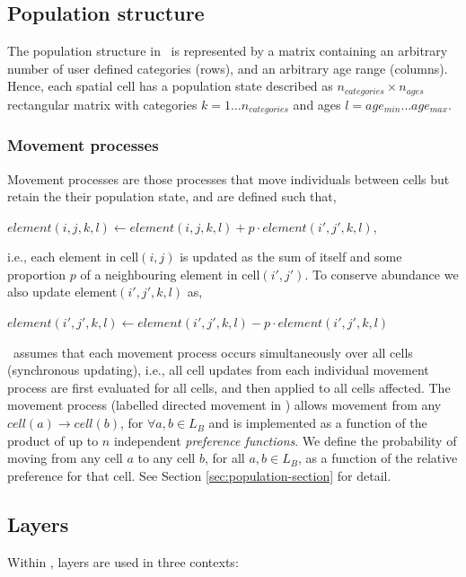 \subsection{Population structure}

The population structure in \SPM\ is represented by a matrix containing an arbitrary number of user defined categories (rows), and an arbitrary age range (columns). Hence, each spatial cell has a population state described as $n_{categories} \times n_{ages}$ rectangular matrix with categories $k=1 \ldots n_{categories}$ and ages $l=age_{min} \ldots age_{max}$. 

\subsubsection*{Movement processes}

Movement processes are those processes that move individuals between cells but retain the their population state, and are defined such that,

$element(i,j,k,l)\leftarrow element(i,j,k,l) + p \cdot element(i',j',k,l)$,

i.e., each element in cell$(i,j)$ is updated as the sum of itself and some proportion $p$ of a neighbouring element in cell$(i',j')$. To conserve abundance we also update element$(i',j',k,l)$ as,

$element(i',j',k,l)\leftarrow element(i',j',k,l) - p\cdot element(i',j',k,l)$

\SPM\ assumes that each movement process occurs simultaneously over all cells (synchronous updating), i.e., all cell updates from each individual movement process are first evaluated for all cells, and then applied to all cells affected. The movement process (labelled directed movement in \SPM) allows movement from any $cell(a) \rightarrow cell(b)$, for $\forall a,b \in L_B$ and is implemented as a function of the product of up to $n$ independent \emph{preference functions}. We define the probability of moving from any cell $a$ to any cell $b$, for all $a,b \in L_B$, as a function of the relative preference for that cell. See Section \ref{sec:population-section} for detail.
\subsection{Layers}

Within \SPM, layers are used in three contexts:

